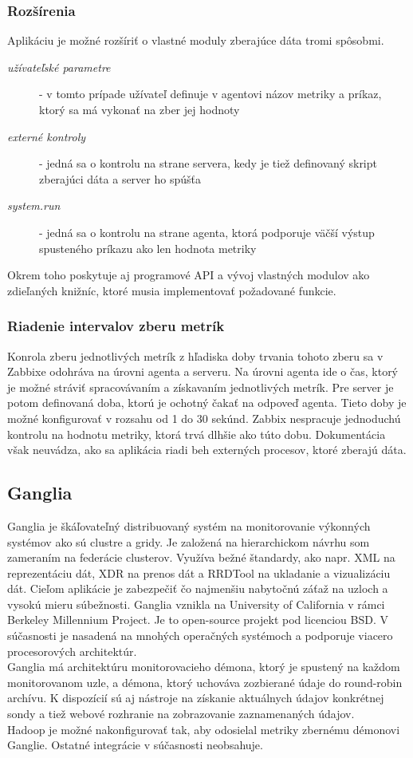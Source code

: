 \documentclass[12pt,twoside,color,cover,table]{fithesis3}
\begin{document}
\subsubsection{Rozšírenia}
Aplikáciu je možné rozšíriť o vlastné moduly zberajúce dáta tromi spôsobmi. %
\begin{description}
\item[\emph{užívateľské parametre}] - v tomto prípade užívateľ definuje v agentovi názov metriky a príkaz, ktorý sa má vykonať na zber jej hodnoty
\item[\emph{externé kontroly}] - jedná sa o kontrolu na strane servera, kedy je tiež definovaný skript zberajúci dáta a server ho spúšťa
\item[\emph{system.run}] - jedná sa o kontrolu na strane agenta, ktorá podporuje väčší výstup spusteného príkazu ako len hodnota metriky
\end{description}
Okrem toho poskytuje aj programové API a vývoj vlastných modulov ako zdieľaných knižníc, ktoré musia implementovať požadované funkcie.

\subsubsection{Riadenie intervalov zberu metrík}
Konrola zberu jednotlivých metrík z hľadiska doby trvania tohoto zberu sa v Zabbixe odohráva na úrovni agenta a serveru. Na úrovni agenta ide o čas, ktorý je možné stráviť spracovávaním a získavaním
jednotlivých metrík. Pre server je potom definovaná doba, ktorú je ochotný čakať na odpoveď agenta. Tieto doby je možné konfigurovať v rozsahu od 1 do 30 sekúnd.
Zabbix nespracuje jednoduchú kontrolu na hodnotu metriky, ktorá trvá dlhšie ako túto dobu.
Dokumentácia však neuvádza, ako sa aplikácia riadi beh externých procesov, ktoré zberajú dáta.

\subsection{Ganglia} 
Ganglia je škáľovateľný distribuovaný systém na monitorovanie výkonných systémov ako sú clustre a gridy. Je založená na hierarchickom návrhu 
som zameraním na federácie clusterov. Využíva bežné štandardy, ako napr. XML na reprezentáciu dát, XDR na prenos dát a RRDTool na
ukladanie a vizualizáciu dát.%
Cieľom aplikácie je zabezpečiť čo najmenšiu nabytočnú záťaž na uzloch a vysokú
mieru súbežnosti. Ganglia vznikla na University of California v rámci Berkeley Millennium Project. Je to open-source projekt
pod licenciou BSD. V súčasnosti je nasadená na mnohých operačných systémoch a podporuje viacero procesorových architektúr.
\\Ganglia má architektúru monitorovacieho démona, ktorý je spustený na každom monitorovanom uzle, a démona, ktorý uchováva zozbierané údaje do
round-robin archívu.
K dispozícií sú aj nástroje na získanie aktuálnych údajov konkrétnej sondy a tiež webové rozhranie na zobrazovanie zaznamenaných údajov.
\\Hadoop je možné nakonfigurovať tak, aby odosielal metriky zbernému démonovi Ganglie. Ostatné integrácie v súčasnosti neobsahuje.
\end{document}
